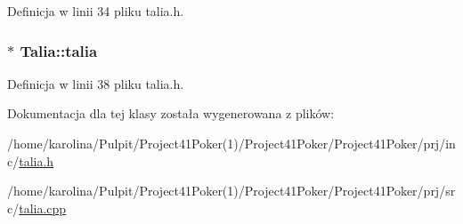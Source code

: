 Definicja w linii 34 pliku talia.\-h.

\hypertarget{class_talia_a611bbe0aca740339a6d4c761afe228c2}{
\subsubsection[{talia}]{$\ast$ Talia\-::talia}}\label{class_talia_a611bbe0aca740339a6d4c761afe228c2}


Definicja w linii 38 pliku talia.\-h.



Dokumentacja dla tej klasy została wygenerowana z plików\-:\begin{DoxyCompactItemize}
\item 
/home/karolina/\-Pulpit/\-Project41\-Poker(1)/\-Project41\-Poker/\-Project41\-Poker/prj/inc/\hyperlink{talia_8h}{talia.\-h}\item 
/home/karolina/\-Pulpit/\-Project41\-Poker(1)/\-Project41\-Poker/\-Project41\-Poker/prj/src/\hyperlink{talia_8cpp}{talia.\-cpp}\end{DoxyCompactItemize}

